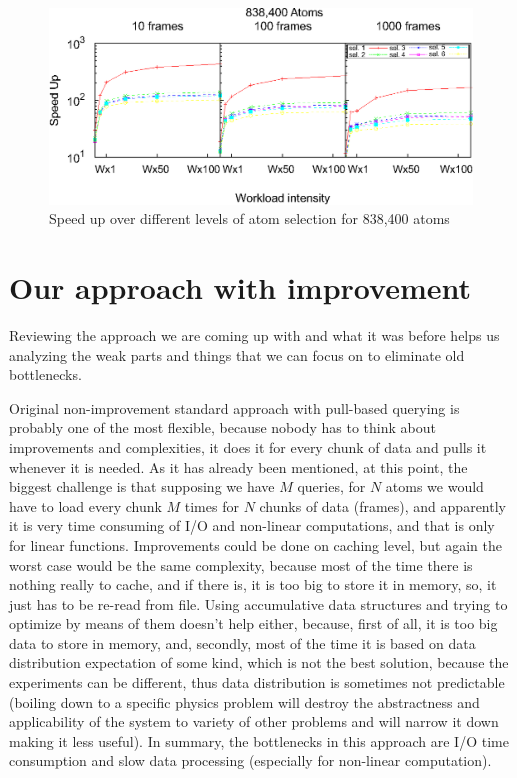 \documentclass[11pt,a4paper]{report}
\begin{document}
\begin{figure}
 \centerline{ \includegraphics[width=0.5\columnwidth]{images/speedup838K-pomalo-za-4.eps} }
 \caption{ Speed up over different levels of atom selection for 838,400 atoms \cite{mainPaper}}
 \label{fg:sample_estimation_old_paper}
\end{figure}

\section{Our approach with improvement}

Reviewing the approach we are coming up with and what it was before helps us analyzing the weak parts and things that we can focus on to eliminate old bottlenecks.

Original non-improvement standard approach with pull-based querying is probably one of the most flexible, because nobody has to think about improvements and complexities, it does it for every chunk of data and pulls it whenever it is needed. As it has already been mentioned, at this point, the biggest challenge is that supposing we have $M$ queries, for $N$ atoms we would have to load every chunk $M$ times for $N$ chunks of data (frames), and apparently it is very time consuming of I/O and non-linear computations, and that is only for linear functions. Improvements could be done on caching level, but again the worst case would be the same complexity, because most of the time there is nothing really to cache, and if there is, it is too big to store it in memory, so, it just has to be re-read from file. Using accumulative data structures and trying to optimize by means of them doesn't help either, because, first of all, it is too big data to store in memory, and, secondly, most of the time it is based on data distribution expectation of some kind, which is not the best solution, because the experiments can be different, thus data distribution is sometimes not predictable (boiling down to a specific physics problem will destroy the abstractness and applicability of the system to variety of other problems and will narrow it down making it less useful). In summary, the bottlenecks in this approach are I/O time consumption and slow data processing (especially for non-linear computation).
\end{document}

